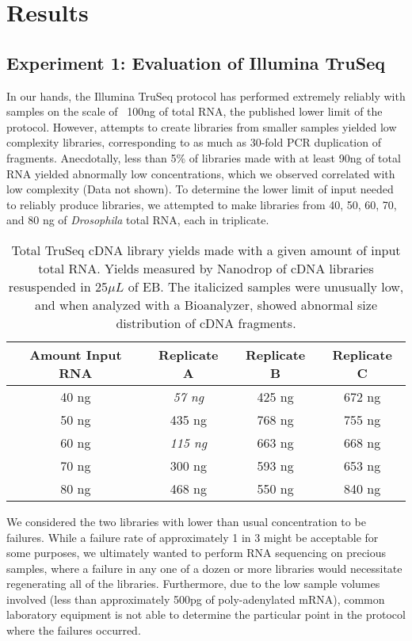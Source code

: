 \section{Results}


\subsection{Experiment 1: Evaluation of Illumina TruSeq}

In our hands, the Illumina TruSeq protocol has performed extremely reliably with samples on the scale of ~100ng of total RNA, the published lower limit of the protocol.  However, attempts to create libraries from smaller samples yielded low complexity libraries, corresponding to as much as 30-fold PCR duplication of fragments. Anecdotally, less than 5\% of libraries made with at least 90ng of total RNA yielded abnormally low concentrations, which we observed correlated with low complexity (Data not shown). To determine the lower limit of input needed to reliably produce libraries, we attempted to make libraries from 40, 50, 60, 70, and 80 ng of {\em Drosophila} total RNA, each in triplicate.

\begin{table}[htdp]
\caption{Total TruSeq cDNA library yields made with a given amount of input total RNA.  Yields measured by Nanodrop of cDNA libraries resuspended in 25$\mu L$ of EB. The italicized samples were unusually low, and when analyzed with a Bioanalyzer, showed abnormal size distribution of cDNA fragments.}
\begin{center}
\begin{tabular}{|c|c|c|c|}\hline
Amount Input RNA & Replicate A & Replicate B & Replicate C\\\hline
40 ng & {\em  57 ng}  & 425 ng & 672 ng\\
50 ng & 435 ng & 768 ng & 755 ng\\
60 ng & {\em 115 ng} & 663 ng & 668 ng\\
70 ng & 300 ng & 593 ng & 653 ng\\
80 ng & 468 ng & 550 ng & 840 ng\\\hline
\end{tabular}
\end{center}
\label{table:truseqtitration}
\end{table}

We considered the two libraries with lower than usual concentration to be failures.  While a failure rate of approximately 1 in 3 might be acceptable for some purposes, we ultimately wanted to perform RNA sequencing on precious samples, where a failure in any one of a dozen or more libraries would necessitate regenerating all of the libraries.  Furthermore, due to the low sample volumes involved (less than approximately 500pg of poly-adenylated mRNA), common laboratory equipment is not able to determine the particular point in the protocol where the failures occurred.  

